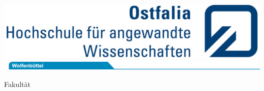 


\frontmatter
\begin{titlepage}


	\thispagestyle{titlepage}
	
	\hfill
	\includegraphics[scale=0.93]{./images/logos/logo_ostfalia.jpg}
	\includegraphics[scale=1.20]{./images/logos/sublogo_wf.jpg}
	
	\hspace{1cm}
	\begin{minipage}{\dimexpr\textwidth-1.5cm\relax}
		{\Large\textsf{Fakultät \faculty}}
	\end{minipage}
	
	\vfil
	

	\hspace{1cm}
	\begin{minipage}{\dimexpr\textwidth-1.5cm\relax}
		\hrulefill
		
		\vspace{2em}
		
		{\Large\textbf{\textsf{\documentSubject}}}
			
		\vspace{2em}
			
		{\Huge\textbf{\textsf{\documentTitle}}}
			
		\vspace{2em}
			
		{\Large\textsf{\documentSubtitle}}
		
		\vspace{1em}
		
		\hrulefill
	\end{minipage}	
	


\end{titlepage}
